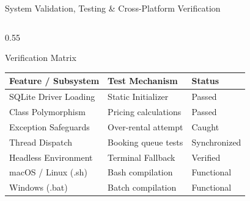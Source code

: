 \documentclass[aspectratio=169,10pt]{beamer}
\begin{document}
\begin{frame}{System Validation, Testing \& Cross-Platform Verification}
    \begin{columns}[T]
        \begin{column}{0.55\textwidth}
            \begin{block}{Verification Matrix}
                \small
                \begin{tabular}{lll}
                    \toprule
                    \textbf{Feature / Subsystem} & \textbf{Test Mechanism} & \textbf{Status} \\
                    \midrule
                    SQLite Driver Loading & Static Initializer & Passed \\
                    Class Polymorphism & Pricing calculations & Passed \\
                    Exception Safeguards & Over-rental attempt & Caught \\
                    Thread Dispatch & Booking queue tests & Synchronized \\
                    Headless Environment & Terminal Fallback & Verified \\
                    macOS / Linux (.sh) & Bash compilation & Functional \\
                    Windows (.bat) & Batch compilation & Functional \\
                    \bottomrule
                \end{tabular}
            \end{block}
        \end{column}
        

\end{columns}
\end{frame}
\end{document}
